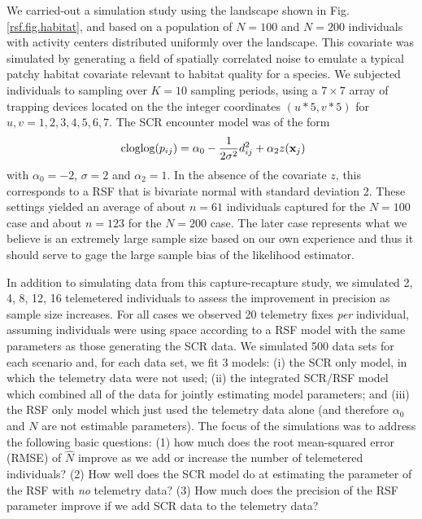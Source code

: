 \documentclass[12pt]{article}
\begin{document}
We carried-out a simulation study using the landscape shown in
Fig. \ref{rsf.fig.habitat}, and based on a population of $N=100$ and $N=200$
individuals with activity centers distributed uniformly over the
landscape.  This covariate was simulated by generating a field
of spatially correlated noise to emulate a typical patchy habitat
covariate relevant to habitat quality for a species.  We subjected individuals
to sampling over $K=10$ sampling periods, using a $7 \times 7$ array
of trapping devices located on the the integer coordinates $(u*5,v*5)$
for $u,v = 1,2,3,4,5,6,7$. The SCR encounter model was of the form
\[
\mbox{ cloglog}(p_{ij}) = \alpha_{0}  -\frac{1}{2\sigma^{2}} d_{ij}^{2} + \alpha_{2}  z({\bf x}_{j})
\]
with $\alpha_{0} = -2$,  $\sigma =2$ and $\alpha_{2} = 1$.
In the absence of the covariate $z$, this corresponds
to a RSF that is bivariate normal with standard
deviation 2.
These settings yielded an average of about $n=61$ individuals captured for
the $N=100$ case and about $n=123$ for the $N=200$ case. The later case
represents what we believe is an extremely large sample size based on
our own experience and thus it should serve to gage the large sample
bias of the likelihood estimator.


In addition to simulating data from this capture-recapture study, we
simulated 2, 4, 8, 12, 16 telemetered individuals
 to assess the
improvement in precision as sample size increases.  For all cases we
observed 20 telemetry fixes {\it per} individual, assuming individuals
were using space according to a RSF model
with the same parameters as those generating the
SCR data. We simulated 500 data sets for each scenario and, for each
data set, we fit 3 models: (i) the SCR only model, in which the
telemetry data were not used; (ii) the integrated SCR/RSF model which
combined all of the data  for jointly estimating model parameters; and
(iii) the RSF only model which just used the telemetry data alone (and
therefore $\alpha_{0}$ and $N$ are not  estimable parameters).
The focus of the simulations was to address the following basic questions:
 (1) how much does
the root mean-squared error (RMSE) of $\hat{N}$ improve as we add or increase the number of
telemetered individuals?  (2) How well does the SCR model do at
estimating the parameter of the RSF with {\it no} telemetry data?  (3)
How much does the precision of the RSF parameter improve if we add SCR
data to the telemetry data?
\end{document}
